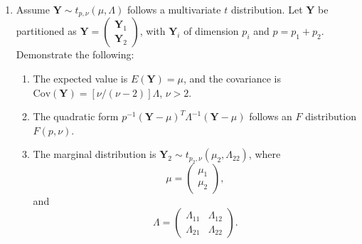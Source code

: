 \documentclass[12pt]{paper}
\numberwithin{equation}{section} %
\numberwithin{figure}{section} %
\numberwithin{table}{section} %
\begin{document}
\begin{enumerate}
\vspace{1.5cm}\item Assume $\mathbf{Y} \sim t_{p,\nu} (\mu, \Lambda)$ follows a multivariate $t$ distribution. Let $\mathbf{Y}$ be partitioned as $\mathbf{Y} = \begin{pmatrix} \mathbf{Y}_1\\\mathbf{Y}_2\end{pmatrix}$, with $\mathbf{Y}_i$ of dimension $p_i$ and $p = p_1 + p_2$. Demonstrate the following:
\begin{enumerate}
  \item The expected value is $E(\mathbf{Y}) = \mu$, and the covariance is $\mathrm{Cov}(\mathbf{Y}) = [\nu/(\nu - 2)]\Lambda$, $\nu > 2$.
  \item The quadratic form $p^{-1} (\mathbf{Y} -\mu)^T \Lambda^{-1} (\mathbf{Y} -\mu)$ follows an $F$ distribution $F(p, \nu)$.
  \item The marginal distribution is $\mathbf{Y}_2 \sim t_{p_2, \nu}(\mu_2 , \Lambda_{22})$, where
  $$\mu = \begin{pmatrix} \mu_1\\\mu_2\end{pmatrix},$$
  and
  $$\Lambda = \begin{pmatrix} \Lambda_{11} & \Lambda_{12} \\ \Lambda_{21} & \Lambda_{22}\end{pmatrix}.$$
\end{enumerate}

\end{enumerate}
\end{document}
